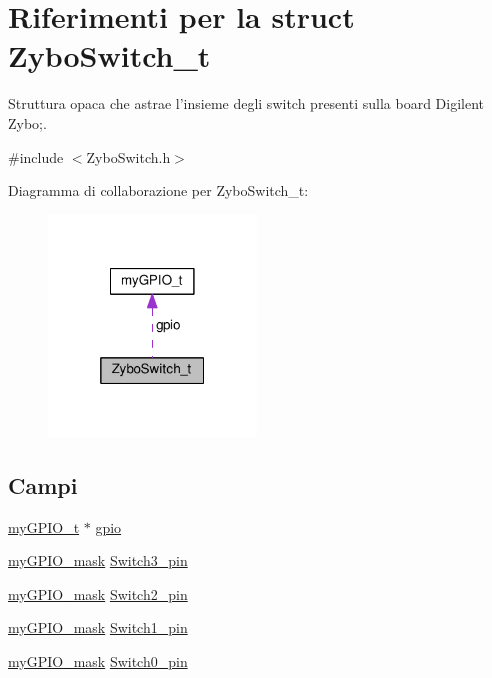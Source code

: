 \hypertarget{struct_zybo_switch__t}{\section{Riferimenti per la struct Zybo\+Switch\+\_\+t}
\label{struct_zybo_switch__t}
}


Struttura opaca che astrae l'insieme degli switch presenti sulla board Digilent Zybo;.  




{\ttfamily \#include $<$Zybo\+Switch.\+h$>$}



Diagramma di collaborazione per Zybo\+Switch\+\_\+t\+:\nopagebreak
\begin{figure}[H]
\begin{center}
\leavevmode
\includegraphics[width=157pt]{struct_zybo_switch__t__coll__graph}
\end{center}
\end{figure}
\subsection*{Campi}
\begin{DoxyCompactItemize}
\item 
\hyperlink{structmy_g_p_i_o__t}{my\+G\+P\+I\+O\+\_\+t} $\ast$ \hyperlink{struct_zybo_switch__t_ac37ddc7c58d246d233dfb38037020184}{gpio}
\item 
\hyperlink{group__my_g_p_i_o_ga402a0d20afc0cb7c25554b8b023f4253}{my\+G\+P\+I\+O\+\_\+mask} \hyperlink{struct_zybo_switch__t_ab2ea73dda75022931396b29e1c377cfb}{Switch3\+\_\+pin}
\item 
\hyperlink{group__my_g_p_i_o_ga402a0d20afc0cb7c25554b8b023f4253}{my\+G\+P\+I\+O\+\_\+mask} \hyperlink{struct_zybo_switch__t_aacdefa991c974546015032b1bb95ea1e}{Switch2\+\_\+pin}
\item 
\hyperlink{group__my_g_p_i_o_ga402a0d20afc0cb7c25554b8b023f4253}{my\+G\+P\+I\+O\+\_\+mask} \hyperlink{struct_zybo_switch__t_aa031241ea0c12a6f327d3697113e992c}{Switch1\+\_\+pin}
\item 
\hyperlink{group__my_g_p_i_o_ga402a0d20afc0cb7c25554b8b023f4253}{my\+G\+P\+I\+O\+\_\+mask} \hyperlink{struct_zybo_switch__t_aa125c82837d72bdb20a0e22f3a86646e}{Switch0\+\_\+pin}
\end{DoxyCompactItemize}


